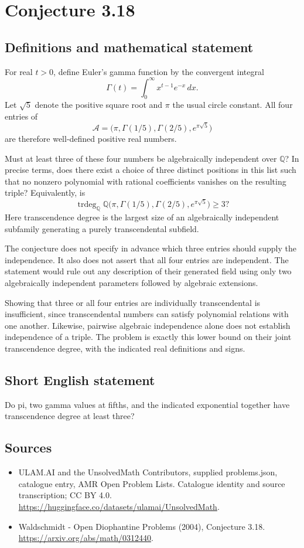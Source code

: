 \documentclass[11pt,a4paper]{article}
\begin{document}
\section*{Conjecture 3.18}\label{statement}

\subsection{Definitions and mathematical statement}
For real $t>0$, define Euler's gamma function by the convergent integral
\[
\Gamma(t)=\int_0^\infty x^{t-1}e^{-x}\,dx.
\]
Let $\sqrt5$ denote the positive square root and $\pi$ the usual circle constant. All four entries of
\[
\mathcal A=\bigl(\pi,\Gamma(1/5),\Gamma(2/5),e^{\pi\sqrt5}\bigr)
\]
are therefore well-defined positive real numbers.

Must at least three of these four numbers be algebraically independent over $\mathbb Q$? In precise terms, does there exist a choice of three distinct positions in this list such that no nonzero polynomial with rational coefficients vanishes on the resulting triple? Equivalently, is
\[
\operatorname{trdeg}_{\mathbb Q}
\mathbb Q\bigl(\pi,\Gamma(1/5),\Gamma(2/5),e^{\pi\sqrt5}\bigr)\ge3?
\]
Here transcendence degree is the largest size of an algebraically independent subfamily generating a purely transcendental subfield.

The conjecture does not specify in advance which three entries should supply the independence. It also does not assert that all four entries are independent. The statement would rule out any description of their generated field using only two algebraically independent parameters followed by algebraic extensions.

Showing that three or all four entries are individually transcendental is insufficient, since transcendental numbers can satisfy polynomial relations with one another. Likewise, pairwise algebraic independence alone does not establish independence of a triple. The problem is exactly this lower bound on their joint transcendence degree, with the indicated real definitions and signs.
\subsection{Short English statement}
Do pi, two gamma values at fifths, and the indicated exponential together have transcendence degree at least three?
\subsection{Sources}
\begin{itemize}
\item[S1] ULAM.AI and the UnsolvedMath Contributors, supplied problems.json, catalogue entry, AMR Open Problem Lists. Catalogue identity and source transcription; CC BY 4.0.
\url{https://huggingface.co/datasets/ulamai/UnsolvedMath}.
\item[S2] Waldschmidt - Open Diophantine Problems (2004), Conjecture 3.18. 
\url{https://arxiv.org/abs/math/0312440}.
\end{itemize}
\end{document}
